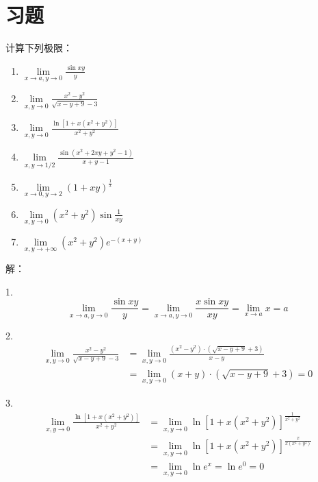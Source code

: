 \section{习题}

\begin{exercise}
计算下列极限：
\begin{enumerate}
    \item $\underset{x\rightarrow a,y\rightarrow 0}{\lim}\frac{\sin xy}{y}$
    \item $\underset{x,y\rightarrow 0}{\lim}\frac{x^2-y^2}{\sqrt{x-y+9}-3}$
    \item $\underset{x,y\rightarrow 0}{\lim}\frac{\ln \left[ 1+x\left( x^2+y^2 \right) \right]}{x^2+y^2}$
    \item $\underset{x,y\rightarrow 1/2}{\lim}\frac{\sin \left( x^2+2xy+y^2-1 \right)}{x+y-1}$
    \item $\underset{x\rightarrow 0,y\rightarrow 2}{\lim}\left( 1+xy \right) ^{\frac{1}{x}}$
    \item $\underset{x,y\rightarrow 0}{\lim}\left( x^2+y^2 \right) \sin \frac{1}{xy}$
    \item $\underset{x,y\rightarrow +\infty }{\lim}\left( x^2+y^2 \right) e^{-\left( x+y \right)}$
\end{enumerate}
\end{exercise}

解：

1.
\[
\underset{x\rightarrow a,y\rightarrow 0}{\lim}\frac{\sin xy}{y}=\underset{x\rightarrow a,y\rightarrow 0}{\lim}\frac{x\sin xy}{xy}=\underset{x\rightarrow a}{\lim}x=a
\]

2.
\begin{align*}
\underset{x,y\rightarrow 0}{\lim}\frac{x^2-y^2}{\sqrt{x-y+9}-3}&=\underset{x,y\rightarrow 0}{\lim}\frac{\left( x^2-y^2 \right) \cdot \left( \sqrt{x-y+9}+3 \right)}{x-y} \\
&=\underset{x,y\rightarrow 0}{\lim}\left( x+y \right) \cdot \left( \sqrt{x-y+9}+3 \right) =0
\end{align*}

3.
\begin{align*}
\underset{x,y\rightarrow 0}{\lim}\frac{\ln \left[ 1+x\left( x^2+y^2 \right) \right]}{x^2+y^2}&=\underset{x,y\rightarrow 0}{\lim}\ln \left[ 1+x\left( x^2+y^2 \right) \right] ^{\frac{1}{x^2+y^2}} \\
&=\underset{x,y\rightarrow 0}{\lim}\ln \left[ 1+x\left( x^2+y^2 \right) \right] ^{\frac{x}{x\left( x^2+y^2 \right)}} \\
&=\underset{x,y\rightarrow 0}{\lim}\ln e^x=\ln e^0=0
\end{align*}

